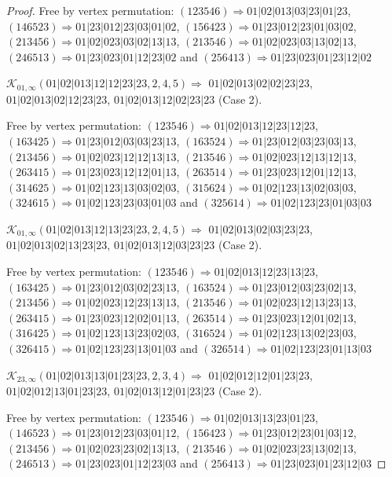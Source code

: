\documentclass[12pt]{article}
\theoremstyle{plain}
\theoremstyle{definition}
\theoremstyle{remark}
\newcommand{\fancy}[1]{\mathcal{#1}}
\def\K{\fancy{K}}
\begin{document}
\begin{proof}
	
	
	Free by vertex permutation: $(1 2 3 5 4 6)\Rightarrow 01|02|013|03|23|01|23$, $(1 4 6 5 2 3)\Rightarrow 01|23|012|23|03|01|02$, $(1 5 6 4 2 3)\Rightarrow 01|23|012|23|01|03|02$, $(2 1 3 4 5 6)\Rightarrow 01|02|023|03|02|13|13$, $(2 1 3 5 4 6)\Rightarrow 01|02|023|03|13|02|13$, $(2 4 6 5 1 3)\Rightarrow 01|23|023|01|12|23|02$ and $(2 5 6 4 1 3)\Rightarrow 01|23|023|01|23|12|02$
	
	
	\bigskip
	
	$\K_{01,\infty}(01|02|013|12|12|23|23,2, 4, 5)\Rightarrow $ $01|02|013|02|02|23|23$, $01|02|013|02|12|23|23$, $01|02|013|12|02|23|23$ (Case 2).
	
	
	
	Free by vertex permutation: $(1 2 3 5 4 6)\Rightarrow 01|02|013|12|23|12|23$, $(1 6 3 4 2 5)\Rightarrow 01|23|012|03|03|23|13$, $(1 6 3 5 2 4)\Rightarrow 01|23|012|03|23|03|13$, $(2 1 3 4 5 6)\Rightarrow 01|02|023|12|12|13|13$, $(2 1 3 5 4 6)\Rightarrow 01|02|023|12|13|12|13$, $(2 6 3 4 1 5)\Rightarrow 01|23|023|12|12|01|13$, $(2 6 3 5 1 4)\Rightarrow 01|23|023|12|01|12|13$, $(3 1 4 6 2 5)\Rightarrow 01|02|123|13|03|02|03$, $(3 1 5 6 2 4)\Rightarrow 01|02|123|13|02|03|03$, $(3 2 4 6 1 5)\Rightarrow 01|02|123|23|03|01|03$ and $(3 2 5 6 1 4)\Rightarrow 01|02|123|23|01|03|03$
	
	
	\bigskip
	
	$\K_{01,\infty}(01|02|013|12|13|23|23,2, 4, 5)\Rightarrow $ $01|02|013|02|03|23|23$, $01|02|013|02|13|23|23$, $01|02|013|12|03|23|23$ (Case 2).
	
	
	
	Free by vertex permutation: $(1 2 3 5 4 6)\Rightarrow 01|02|013|12|23|13|23$, $(1 6 3 4 2 5)\Rightarrow 01|23|012|03|02|23|13$, $(1 6 3 5 2 4)\Rightarrow 01|23|012|03|23|02|13$, $(2 1 3 4 5 6)\Rightarrow 01|02|023|12|23|13|13$, $(2 1 3 5 4 6)\Rightarrow 01|02|023|12|13|23|13$, $(2 6 3 4 1 5)\Rightarrow 01|23|023|12|02|01|13$, $(2 6 3 5 1 4)\Rightarrow 01|23|023|12|01|02|13$, $(3 1 6 4 2 5)\Rightarrow 01|02|123|13|23|02|03$, $(3 1 6 5 2 4)\Rightarrow 01|02|123|13|02|23|03$, $(3 2 6 4 1 5)\Rightarrow 01|02|123|23|13|01|03$ and $(3 2 6 5 1 4)\Rightarrow 01|02|123|23|01|13|03$
	
	
	\bigskip
	
	$\K_{23,\infty}(01|02|013|13|01|23|23,2, 3, 4)\Rightarrow $ $01|02|012|12|01|23|23$, $01|02|012|13|01|23|23$, $01|02|013|12|01|23|23$ (Case 2).
	
	
	
	Free by vertex permutation: $(1 2 3 5 4 6)\Rightarrow 01|02|013|13|23|01|23$, $(1 4 6 5 2 3)\Rightarrow 01|23|012|23|03|01|12$, $(1 5 6 4 2 3)\Rightarrow 01|23|012|23|01|03|12$, $(2 1 3 4 5 6)\Rightarrow 01|02|023|23|02|13|13$, $(2 1 3 5 4 6)\Rightarrow 01|02|023|23|13|02|13$, $(2 4 6 5 1 3)\Rightarrow 01|23|023|01|12|23|03$ and $(2 5 6 4 1 3)\Rightarrow 01|23|023|01|23|12|03$
	

\end{proof}
\end{document}
